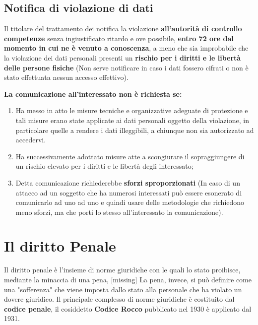 \documentclass[twocolumn]{article}
\begin{document}
\subsection{Notifica di violazione di dati}
Il titolare del trattamento dei notifica la violazione \textbf{all'autorità di controllo competenze} senza ingiustificato ritardo e ove possibile, \textbf{entro 72 ore dal momento in cui ne è venuto a conoscenza}, a meno che sia improbabile che la violazione dei dati personali presenti un \textbf{rischio per i diritti e le libertà delle persone fisiche} (Non serve notificare in caso i dati fossero cifrati o non è stato effettuata nessun accesso effettivo).

\textbf{La comunicazione all'interessato non è richiesta se:}
\begin{enumerate}
    \item Ha messo in atto le misure tecniche e organizzative adeguate di protezione e tali misure erano state applicate ai dati personali oggetto della violazione, in particolare quelle a rendere i dati illeggibili, a chiunque non sia autorizzato ad accedervi.
    \item Ha successivamente adottato misure atte a scongiurare il sopraggiungere di un rischio elevato per i diritti e le libertà degli interessato;
    \item Detta comunicazione richiederebbe \textbf{sforzi sproporzionati} (In caso di un attacco ad un soggetto che ha numerosi interessati può essere esonerato di comunicarlo ad uno ad uno e quindi usare delle metodologie che richiedono meno sforzi, ma che porti lo stesso all'interessato la comunicazione).
\end{enumerate}
\section{Il diritto Penale}
Il diritto penale è l'insieme di norme giuridiche con le quali lo stato proibisce, mediante la minaccia di una pena, [missing]
\newline La pena, invece, si può definire come una "sofferenza" che viene imposta dallo stato alla personale che ha violato un dovere giuridico. Il principale complesso di norme giuridiche è costituito dal \textbf{codice penale}, il cosiddetto \textbf{Codice Rocco} pubblicato nel 1930 è applicato dal 1931.
\end{document}

